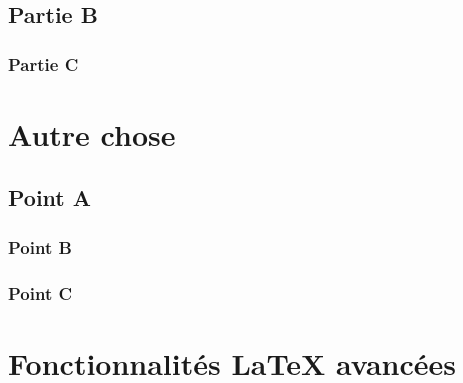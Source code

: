 \subsection{Partie B}
\subsubsection{Partie C}

\section{Autre chose}
\subsection{Point A}
\subsubsection{Point B}
\subsubsection{Point C}

\pagebreak
























\section{Fonctionnalités \LaTeX{} avancées}

